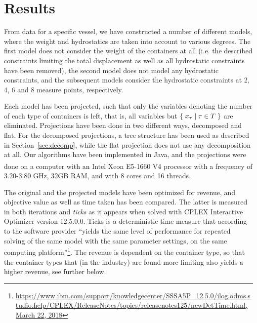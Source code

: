 %
%

\section{Results}\label{sec:results}
From data for a specific vessel, we have constructed a number of different models, where the weight and hydrostatics are taken into account to various degrees. The first model does not consider the weight of the containers at all (i.e. the described constraints limiting the total displacement as well as all hydrostatic constraints have been removed), the second model does not model any hydrostatic constraints, and the subsequent models consider the hydrostatic constraints at 2, 4, 6 and 8 measure points, respectively.

Each model has been projected, such that only the variables denoting the number of each type of containers is left, that is, all variables but $\{\;{x_\tau}\;|\;{\tau\in T}\;\}$ are eliminated. 
Projections have been done in two different ways, decomposed and flat. For the decomposed projections, a tree structure has been used as described in Section~\ref{sec:decomp}, while the flat projection does not use any decomposition at all. %
Our algorithms have been implemented in Java, and the projections were done on a computer with an {Intel\textsuperscript{\textregistered} Xeon\textsuperscript{\textregistered} E5-1660 V4 processor with a frequency of 3.20-3.80 GHz, 32GB RAM, and with 8 cores and 16 threads.}

The original and the projected models have been optimized for revenue, and objective value as well as time taken has been compared. The latter is measured in both iterations and \emph{ticks} as it appears when solved with CPLEX Interactive Optimizer version 12.5.0.0. Ticks is a deterministic time measure that according to the software provider ``yields the same level of performance for repeated solving of the same model with the same parameter settings, on the same computing platform''\footnote{\url{https://www.ibm.com/support/knowledgecenter/SSSA5P_12.5.0/ilog.odms.studio.help/CPLEX/ReleaseNotes/topics/releasenotes125/newDetTime.html, March 22, 2018}}. 
The revenue is dependent on the container type, so that the container types that (in the industry) are found more limiting also yields a higher revenue, see further below. 

